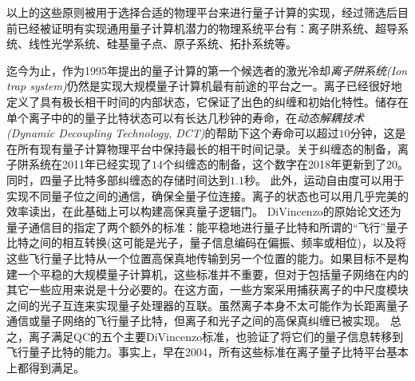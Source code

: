 以上的这些原则被用于选择合适的物理平台来进行量子计算的实现，经过筛选后目前已经被证明有实现通用量子计算机潜力的物理系统平台有：离子阱系统、超导系统、线性光学系统、硅基量子点、原子系统、拓扑系统等。

迄今为止，作为1995年提出的量子计算的第一个候选者的激光冷却\emph{离子阱系统(Ion trap system)}仍然是实现大规模量子计算机最有前途的平台之一。离子已经很好地定义了具有极长相干时间\cite[]{Fisk_Sellars_Lawn_Coles_1997}的内部状态，它保证了出色的纠缠和初始化特性\cite[]{Blatt_Wineland_2008}。储存在单个离子中的的量子比特状态可以有长达几秒钟的寿命\cite[]{Langer_Ozeri_Jost_Chiaverini_DeMarco_Ben_Kish_Blakestad_Britton_Hume_Itano_et_al_2005}，在\emph{动态解耦技术(Dynamic Decoupling Technology, DCT)}的帮助下这个寿命可以超过$10$分钟\cite[]{Wang_Um_Zhang_An_Lyu_Zhang_Duan_Yum_Kim_2017}，这是在所有现有量子计算物理平台中保持最长的相干时间记录。关于纠缠态的制备，离子阱系统在2011年已经实现了$14$个纠缠态的制备\cite[]{Monz_Schindler_Barreiro_Chwalla_Nigg_Coish_Harlander_Hänsel_Hennrich_Blatt_2011}，这个数字在2018年更新到了20\cite[]{Friis_Marty_Maier_Hempel_Holzäpfel_Jurcevic_Plenio_Huber_Roos_Blatt_et_al_2018}。同时，四量子比特多部纠缠态的存储时间达到$1.1$秒\cite[]{Kaufmann_Ruster_Schmiegelow_Luda_Kaushal_Schulz_von_Lindenfels_Schmidt_Kaler_Poschinger_2017}。
此外，运动自由度可以用于实现不同量子位之间的通信，确保全量子位连接\cite[]{Debnath_Linke_Figgatt_Landsman_Wright_Monroe_2016}。离子的状态也可以用几乎完美的效率读出\cite[]{Myerson_Szwer_Webster_Allcock_Curtis_Imreh_Sherman_Stacey_Steane_Lucas_2008}，在此基础上可以构建高保真量子逻辑门\cite[]{Ballance_Harty_Linke_Sepiol_Lucas_2016}。
DiVincenzo的原始论文还为量子通信目的指定了两个额外的标准：能平稳地进行量子比特和所谓的“飞行”量子比特之间的相互转换(这可能是光子，量子信息编码在偏振、频率或相位)，以及将这些飞行量子比特从一个位置高保真地传输到另一个位置的能力。如果目标不是构建一个平稳的大规模量子计算机，这些标准并不重要，但对于包括量子网络在内的其它一些应用来说是十分必要的。在这方面，一些方案采用捕获离子的中尺度模块之间的光子互连来实现量子处理器的互联\cite[]{Monroe_Raussendorf_Ruthven_Brown_Maunz_Duan_Kim_2014}。虽然离子本身不太可能作为长距离量子通信或量子网络的飞行量子比特，但离子和光子之间的高保真纠缠已被实现\cite[]{Moehring_Blinov_Madsen_Duan_Monroe_2004}。
总之，离子满足QC的五个主要DiVincenzo标准，也验证了将它们的量子信息转移到飞行量子比特的能力。事实上，早在2004，所有这些标准在离子量子比特平台基本上都得到满足\cite[]{Leibfried_DeMarco_Meyer_Lucas_Barrett_Britton_Itano_Jelenković_Langer_Rosenband_et_al_2003,Moehring_Blinov_Madsen_Duan_Monroe_2004}。


